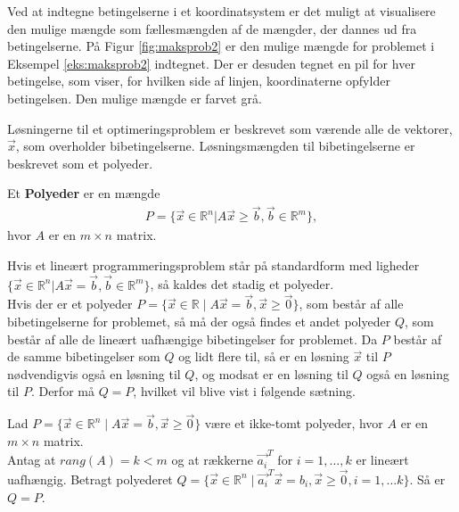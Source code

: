 \begin{eks}
Ved at indtegne betingelserne i et koordinatsystem er det muligt at visualisere den mulige mængde som fællesmængden af de mængder, der dannes ud fra betingelserne. På Figur \ref{fig:maksprob2} er den mulige mængde for problemet i Eksempel \ref{eks:maksprob2} indtegnet. Der er desuden tegnet en pil for hver betingelse, som viser, for hvilken side af linjen, koordinaterne opfylder betingelsen. Den mulige mængde er farvet grå.

\begin{center}
	
	\label{fig:maksprob2}
\end{center}
\end{eks}

Løsningerne til et optimeringsproblem er beskrevet som værende alle de vektorer, $\vec{x}$, som overholder bibetingelserne. Løsningsmængden til bibetingelserne er beskrevet som et polyeder.
\begin{defn} [Polyeder]
Et \textbf{Polyeder} er en mængde 
\begin{align*}
 P =\{ \vec{x} \in \mathds{R}^n | A \vec{x} \geq \vec{b}, \vec{b}\in \mathds{R}^m\},
\end{align*}
hvor $A$ er en $m \times n$ matrix.
\end{defn}
Hvis et lineært programmeringsproblem står på standardform med ligheder $\{ \vec{x} \in \mathds{R}^n | A \vec{x} = \vec{b}, \vec{b}\in \mathds{R}^m\}$, så kaldes det stadig et polyeder.\\
Hvis der er et polyeder $P=\{\vec{x} \in \mathds{R}\mid A\vec{x}=\vec{b},\vec{x}\geq \vec{0}\}$, som består af alle bibetingelserne for problemet, så må der også findes et andet polyeder $Q$, som består af alle de lineært uafhængige bibetingelser for problemet. Da $P$ består af de samme bibetingelser som $Q$ og lidt flere til, så er en løsning $\vec{x}$ til $P$ nødvendigvis også en løsning til $Q$, og modsat er en løsning til $Q$ også en løsning til $P$. Derfor må $Q=P$, hvilket vil blive vist i følgende sætning.

\begin{stn}[Q=P]
Lad $P=\{\vec{x} \in \mathds{R}^n\mid A\vec{x}=\vec{b},\vec{x}\geq \vec{0}\}$ være et ikke-tomt polyeder, hvor $A$ er en $m\times n$ matrix.\\
Antag at $rang(A)=k<m$ og at rækkerne $\vec{a_i}^T$ for $i=1,\dots ,k$ er lineært uafhængig. Betragt polyederet $Q=\{\vec{x} \in \mathds{R}^n\mid \vec{a_i}^T\vec{x}=b_{i}, \vec{x}\geq \vec{0}, i = 1,\dots	k\}$. Så er $Q=P$.
\label{stn:PQ}
\end{stn}

